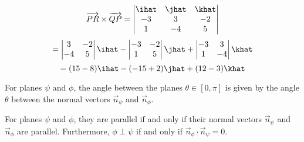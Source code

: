 $$\overrightarrow{PR}\times\overrightarrow{QP}=\begin{vmatrix}
	\ihat&\jhat&\khat\\
	-3&3&-2\\
	1&-4&5
\end{vmatrix}$$
$$=\begin{vmatrix}3&-2\\-4&5\end{vmatrix}\ihat-\begin{vmatrix}-3&-2\\1&5\end{vmatrix}\jhat+\begin{vmatrix}-3&3\\1&-4\end{vmatrix}\khat$$
$$=(15-8)\ihat-(-15+2)\jhat+(12-3)\khat$$
\begin{definition}\label{def:2}
	For planes $\psi$ and $\phi$, the angle between the planes $\theta\in[0,\pi]$ is given by the angle $\theta$ between the normal vectors $\vec{n}_\psi$ and $\vec{n}_\phi$.
\end{definition}
\begin{definition}\label{def:3}
	For planes $\psi$ and $\phi$, they are parallel if and only if their normal vectors $\vec{n}_\psi$ and $\vec{n}_\phi$ are parallel. Furthermore, $\phi\perp\psi$ if and only if $\vec{n}_\phi\cdot\vec{n}_\psi=0$.
\end{definition}